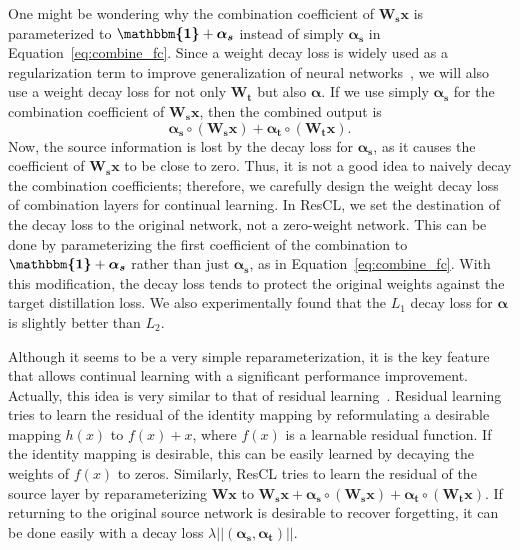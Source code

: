 \documentclass[letterpaper]{article}
\begin{document}
One might be wondering why the combination coefficient of $\bm{W_s x}$ is parameterized to $\bm{\mathbbm{1}} + \bm{\alpha_s}$ instead of simply $\bm{\alpha_s}$ in Equation~\ref{eq:combine_fc}.
Since a weight decay loss is widely used as a regularization term to improve generalization of neural networks~\cite{krogh1992simple}, we will also use a weight decay loss for not only $\bm{W_t}$ but also $\bm{\alpha}$. If we use simply $\bm{\alpha_s}$ for the combination coefficient of $\bm{W_s x}$, then the combined output is
\begin{equation}
\bm{\alpha_s} \circ \left(\bm{W_s x}\right) + \bm{\alpha_t} \circ \left(\bm{W_t x}\right) .
\label{eq:combine_decay}
\end{equation}
Now, the source information is lost by the decay loss for $\bm{\alpha_s}$, as it causes the coefficient of $\bm{W_s x}$ to be close to zero. Thus, it is not a good idea to naively decay the combination coefficients; therefore, we carefully design the weight decay loss of combination layers for continual learning. In ResCL, we set the destination of the decay loss to the original network, not a zero-weight network. This can be done by parameterizing the first coefficient of the combination to $\bm{\mathbbm{1}}+\bm{\alpha_s}$ rather than just $\bm{\alpha_s}$, as in Equation~\ref{eq:combine_fc}. With this modification, the decay loss tends to protect the original weights against the target distillation loss. We also experimentally found that the $L_1$ decay loss for $\bm{\alpha}$ is slightly better than $L_2$.

Although it seems to be a very simple reparameterization, it is the key feature that allows continual learning with a significant performance improvement. Actually, this idea is very similar to that of residual learning~\cite{he2016deep}. Residual learning tries to learn the residual of the identity mapping by reformulating a desirable mapping $h(x)$ to $f(x) + x$, where $f(x)$ is a learnable residual function. If the identity mapping is desirable, this can be easily learned by decaying the weights of $f(x)$ to zeros. Similarly, ResCL tries to learn the residual of the source layer by reparameterizing $\bm{W x}$ to $\bm{W_s x} + \bm{\alpha_s} \circ \left( \bm{W_s x} \right) + \bm{\alpha_t} \circ \left( \bm{W_t x} \right)$. If returning to the original source network is desirable to recover forgetting, it can be done easily with a decay loss $\lambda || ( \bm{\alpha_s}, \bm{\alpha_t} ) ||$.
\end{document}
